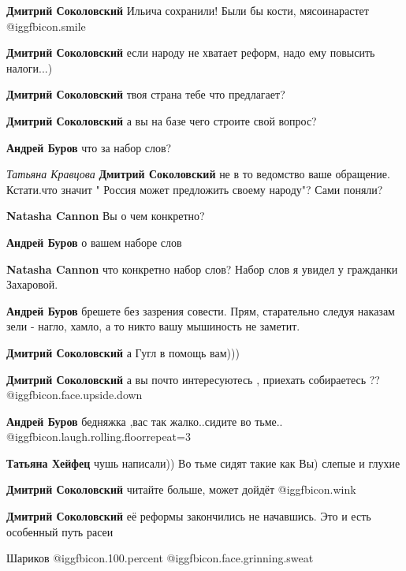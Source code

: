 \begin{itemize}
\begin{itemize}
\textbf{Дмитрий Соколовский} Ильича сохранили!
Были бы кости, мясоинарастет  @igg{fbicon.smile} 

\textbf{Дмитрий Соколовский} если народу не хватает реформ, надо ему повысить налоги...)

\textbf{Дмитрий Соколовский} твоя страна тебе что предлагает?

\textbf{Дмитрий Соколовский} а вы на базе чего строите свой вопрос?

\textbf{Андрей Буров} что за набор слов?

\emph{Татьяна Кравцова}
\textbf{Дмитрий Соколовский} не в то ведомство ваше обращение. Кстати.что значит " Россия может предложить своему народу"? Сами поняли?

\textbf{Natasha Cannon} Вы о чем конкретно?

\textbf{Андрей Буров} о вашем наборе слов

\textbf{Natasha Cannon} что конкретно набор слов? Набор слов я увидел у гражданки Захаровой.

\textbf{Андрей Буров} брешете без зазрения совести. Прям, старательно следуя наказам зели - нагло, хамло, а то никто вашу мышиность не заметит.

\textbf{Дмитрий Соколовский} а Гугл в помощь вам)))

\textbf{Дмитрий Соколовский} а вы почто интересуютесь , приехать собираетесь ?? @igg{fbicon.face.upside.down} 

\textbf{Андрей Буров} бедняжка ,вас так жалко..сидите во тьме.. @igg{fbicon.laugh.rolling.floor}{repeat=3} 

\textbf{Татьяна Хейфец} чушь написали)) Во тьме сидят такие как Вы) слепые и глухие

\textbf{Дмитрий Соколовский} читайте больше, может дойдёт  @igg{fbicon.wink} 

\textbf{Дмитрий Соколовский} её реформы закончились не начавшись. Это и есть особенный путь расеи


\end{itemize} %

Шариков  @igg{fbicon.100.percent}  @igg{fbicon.face.grinning.sweat} 



\end{itemize}
